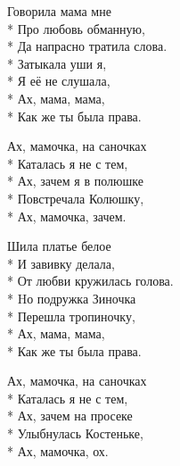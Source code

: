 \medskip

\begin{minipage}{\linewidth}
Говорила мама мне\\*
Про любовь обманную,\\*
Да напрасно тратила слова.\\*
Затыкала уши я,\\*
Я её не слушала,\\*
Ах, мама, мама,\\*
Как же ты была права.\\
\end{minipage}\par\medskip\nobreak

\medskip

\begin{minipage}{\linewidth}
\hspace*{1.5em}Ах, мамочка, на саночках\\*
\hspace*{1.5em}Каталась я не с тем,\\*
\hspace*{1.5em}Ах, зачем я в полюшке\\*
\hspace*{1.5em}Повстречала Колюшку,\\*
\hspace*{1.5em}Ах, мамочка, зачем.\\
\end{minipage}\par\medskip\nobreak

\medskip

\begin{minipage}{\linewidth}
Шила платье белое\\*
И завивку делала,\\*
От любви кружилась голова.\\*
Hо подружка Зиночка\\*
Перешла тропиночку,\\*
Ах, мама, мама,\\*
Как же ты была права.\\
\end{minipage}\par\medskip\nobreak

\medskip

\begin{minipage}{\linewidth}
\hspace*{1.5em}Ах, мамочка, на саночках\\*
\hspace*{1.5em}Каталась я не с тем,\\*
\hspace*{1.5em}Ах, зачем на просеке\\*
\hspace*{1.5em}Улыбнулась Костеньке,\\*
\hspace*{1.5em}Ах, мамочка, ох.\\
\end{minipage}\par\medskip\nobreak

